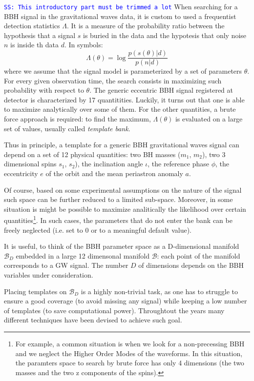\documentclass[twocolumn,showpacs,preprintnumbers,nofootinbib,prd,
superscriptaddress,10pt]{revtex4-2}
\newcommand{\stefano}[1]{{\textcolor{blue}{\texttt{SS: #1}} }}
\begin{document}
\stefano{This introductory part must be trimmed a lot}
When searching for a BBH signal in the gravitational waves data, it is custom to used a frequentist detection statistics $\Lambda$. It is a measure of the probability ratio between the hypothesis that a signal $s$ is buried in the data and the hypotesis that only noise $n$ is inside th data $d$. In symbols:
\begin{equation}\label{eq:LL}
	\Lambda(\theta) = \log\frac{p(s(\theta)|d)}{p(n|d)}
\end{equation}
where we assume that the signal model is parameterized by a set of parameters $\theta$.
For every given observation time, the search consists in maximizing such probability with respect to $\theta$. 
The generic eccentric BBH signal registered at detector is characterized by 17 quantitities. Luckily, it turns out that one is able to maximize analytically over some of them. For the other quantities, a brute force approach is required: to find the maximum, $\Lambda(\theta)$ is evaluated on a large set of values, usually called {\it template bank}. 

Thus in principle, a template for a generic BBH gravitational waves signal can depend on a set of 12 physical quantities: two BH masses ($m_1$, $m_2$), two 3 dimensional spins $s_1$, $s_2$), the inclination angle $\iota$, the reference phase $\phi$, the eccentricity $e$ of the orbit and the mean periastron anomaly $a$.

Of course, based on some experimental assumptions on the nature of the signal such space can be further reduced to a limited sub-space. Moreover, in some situation is might be possible to maximize analitically the likelihood over certain quantities\footnote{
For example, a common situation is when we look for a non-precessing BBH and we neglect the Higher Order Modes of the waveforms. In this situation, the paramters space to search by brute force has only 4 dimensions (the two masses and the two z components of the spins).}.
In such cases, the parameters that do not enter the bank can be freely neglected (i.e. set to $0$ or to a meaningful default value).

It is useful, to think of the BBH parameter space as a D-dimensional manifold $\mathcal{B}_D$ embedded in a large 12 dimensonal manifold $\mathcal{B}$: each point of the manifold corresponds to a GW signal. The number $D$ of dimensions depends on the BBH variables under consideration.

Placing templates on $\mathcal{B}_D$ is a highly non-trivial task, as one has to struggle to ensure a good coverage (to avoid missing any signal) while keeping a low number of templates (to save computational power).
Throughtout the years many different techniques have been devised to achieve such goal.
\end{document}
